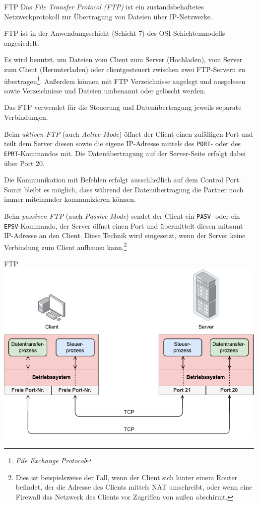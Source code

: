 \begin{defi}{FTP}
    Das \emph{File Transfer Protocol (FTP)} ist ein zustandsbehaftetes Netzwerkprotokoll zur Übertragung von Dateien über IP-Netzwerke.

    FTP ist in der Anwendungsschicht (Schicht 7) des OSI-Schichtenmodells angesiedelt.

    Es wird benutzt, um Dateien vom Client zum Server (Hochladen), vom Server zum Client (Herunterladen) oder clientgesteuert zwischen zwei FTP-Servern zu übertragen\footnote{\emph{File Exchange Protocol}}.
    Außerdem können mit FTP Verzeichnisse angelegt und ausgelesen sowie Verzeichnisse und Dateien umbenannt oder gelöscht werden.

    Das FTP verwendet für die Steuerung und Datenübertragung jeweils separate Verbindungen.

    Beim \emph{aktiven FTP} (auch \emph{Active Mode}) öffnet der Client einen zufälligen Port und teilt dem Server diesen sowie die eigene IP-Adresse mittels des \texttt{PORT}- oder des \texttt{EPRT}-Kommandos mit.
    Die Datenübertragung auf der Server-Seite erfolgt dabei über Port 20.

    Die Kommunikation mit Befehlen erfolgt ausschließlich auf dem Control Port.
    Somit bleibt es möglich, dass während der Datenübertragung die Partner noch immer miteinander kommunizieren können.

    Beim \emph{passiven FTP} (auch \emph{Passive Mode}) sendet der Client ein \texttt{PASV}- oder ein \texttt{EPSV}-Kommando, der Server öffnet einen Port und übermittelt diesen mitsamt IP-Adresse an den Client.
    Diese Technik wird eingesetzt, wenn der Server keine Verbindung zum Client aufbauen kann.\footnote{Dies ist beispielsweise der Fall, wenn der Client sich hinter einem Router befindet, der die Adresse des Clients mittels NAT umschreibt, oder wenn eine Firewall das Netzwerk des Clients vor Zugriffen von außen abschirmt.}
\end{defi}

\begin{example}{FTP}
    \centering
    \includegraphics[width=.7\textwidth]{includes/figures/example_ftp.pdf}
\end{example}

